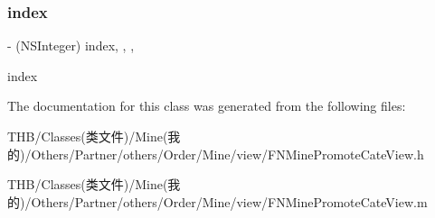 \subsubsection{\texorpdfstring{index}{index}}
{\footnotesize\ttfamily -\/ (N\+S\+Integer) index\hspace{0.3cm}{\ttfamily [read]}, {\ttfamily [write]}, {\ttfamily [nonatomic]}, {\ttfamily [assign]}}

index 

The documentation for this class was generated from the following files\+:\begin{DoxyCompactItemize}
\item 
T\+H\+B/\+Classes(类文件)/\+Mine(我的)/\+Others/\+Partner/others/\+Order/\+Mine/view/F\+N\+Mine\+Promote\+Cate\+View.\+h\item 
T\+H\+B/\+Classes(类文件)/\+Mine(我的)/\+Others/\+Partner/others/\+Order/\+Mine/view/F\+N\+Mine\+Promote\+Cate\+View.\+m\end{DoxyCompactItemize}
